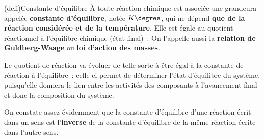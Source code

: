 \documentclass[../../main/main.tex]{subfiles}
\begin{document}
\begin{tcb}[label=def:K](defi){Constante d'équilibre}
	À toute réaction chimique est associée une grandeura appelée \textbf{constante
		d'équilibre}, notée $K\degree$, qui ne dépend \textbf{que de la réaction
		considérée et de la température}. Elle est égale au quotient réactionnel à
	l'équilibre chimique (état final)~:
	\csw{
		\[
			\boxed{K \degree = Q_{r, \eq}}
		\]
	}
	On l'appelle aussi la \textbf{relation de Guldberg-Waage} ou \textbf{loi
		d'action des masses}.
\end{tcb}

Le quotient de réaction va évoluer de telle sorte à être égal à la constante de
réaction à l'équilibre~: celle-ci permet de déterminer l'état d'équilibre du
système, puisqu'elle donnera le lien entre les activités des composants à
l'avancement final et donc la composition du système.

On constate assez évidemment que la constante d'équilibre d'une réaction écrit
dans un sens est l'\textbf{inverse} de la constante d'équilibre de la même
réaction écrite dans l'autre sens.
\end{document}
